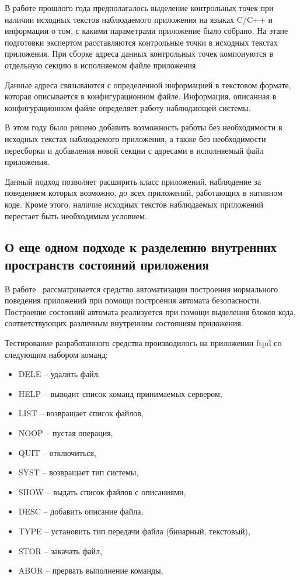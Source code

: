 В работе прошлого года предполагалось выделение 
контрольных точек при наличии исходных текстов 
наблюдаемого приложения на языках C/C++ и
информации о том, 
с какими параметрами приложение было собрано.
На этапе подготовки экспертом расставляются 
контрольные точки в исходных текстах приложения. 
При сборке адреса данных контрольных точек 
компонуются в отдельную секцию в исполняемом 
файле приложения. 

Данные адреса связываются с определенной информацией 
в текстовом формате, которая описывается в конфигурационном файле.
Информация, описанная в конфигурационном файле 
определяет работу наблюдающей системы.

В этом году было решено добавить возможность работы 
без необходимости в исходных текстах наблюдаемого 
приложения, а также без необходимости пересборки 
и добавления новой секции с адресами в исполняемый 
файл приложения.

Данный подход позволяет расширить класс приложений, 
наблюдение за поведением которых возможно, до всех 
приложений, работающих в нативном коде. Кроме этого, 
наличие исходных текстов наблюдаемых приложений 
перестает быть необходимым условием.

\subsection{О еще одном подходе к разделению внутренних пространств 
		состояний приложения}
\bigskip 
В работе~\cite{gornak} рассматривается средство автоматизации 
построения нормального поведения приложений при помощи
построения автомата безопасности.  Построение 
состояний автомата реализуется при помощи выделения 
блоков кода, соответствующих различным внутренним 
состояниям приложения. 

Тестирование разработанного средства производилось 
на приложении ftpd со следующим набором команд: 

\begin{itemize}
\item DELE -- удалить файл,
\item HELP -- выводит список команд принимаемых сервером,
\item LIST -- возвращает список файлов,
\item NOOP -- пустая операция,
\item QUIT -- отключиться,
\item SYST -- возвращает тип системы,
\item SHOW -- выдать список файлов с описаниями,
\item DESC -- добавить описание файла,
\item TYPE -- установить тип передачи файла (бинарный, текстовый),
\item STOR -- закачать файл,
\item ABOR -- прервать выполнение команды,
\end{itemize}

